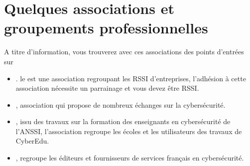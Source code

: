 \section{Quelques associations et groupements professionnelles} 

A titre d'information, vous trouverez avec ces associations des points d'entrées sur 

\begin{itemize}
  \item {}.
le  est une association regroupant les RSSI d'entreprises, l'adhésion à cette association nécessite un parrainage et vous devez être RSSI.

  \item{}
, association qui propose de nombreux échanges sur la cybersécurité.

  \item{}
, issu des travaux sur la formation des enseignants en cybersécurité de l'ANSSI, l'association regroupe les écoles et les utilisateurs des travaux de CyberEdu.

  \item{}
, regroupe les éditeurs et fournisseurs de services français en cybersécurité.
\end{itemize}

